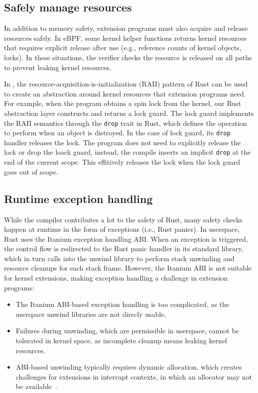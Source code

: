 \subsection{Safely manage resources}
In addition to memory safety, extension programs must also acquire and release
    resources safely.
In eBPF, some kernel helper functions returns kernel resources that requires
    explicit release after use (e.g., reference counts of kernel objects,
    locks).
In these situations, the verifier checks the resource is released on all paths
    to prevent leaking kernel resources.

In \projname{}, the resource-acquisition-is-initialization (RAII) pattern of
    Rust can be used to create an abstraction around kernel resources that
    extension programs need.
For example, when the program obtains a spin lock from the kernel, our Rust
    abstraction layer constructs and returns a lock guard.
The lock guard implements the RAII semantics through the \texttt{drop} trait in
    Rust, which defines the operation to perform when an object is distroyed.
In the case of lock guard, its \texttt{drop} handler releases the lock.
The program does not need to explicitly release the lock or drop the loack
    guard, instead, the compile inserts an implicit \texttt{drop} at the end of
    the current scope. This effitively releases the lock when the lock guard
    goes out of scope.

\subsection{Runtime exception handling}
While the compiler contributes a lot to the safety of Rust, many safety checks
    happen at runtime in the form of exceptions (i.e., Rust panics).
In userspace, Rust uses the Itanium exception handling ABI.
When an exception is triggered, the control flow is redirected to the Rust
    panic handler in its standard library, which in turn calls into the unwind
    library to perform stack unwinding and resource cleanups for each stack
    frame.
However, the Itanium ABI is not suitable for kernel extensions, making
    exception handling a challenge in extension programs:
\begin{itemize}
    \item The Itanium ABI-based exception handling is too complicated, as the
        userspace unwind libraries are not direcly usable.
    \item Failures during unwinding, which are permissible in userspace, cannot
        be tolerated in kernel space, as incomplete cleanup means leaking
        kernel resources.
    \item ABI-based unwinding typically requires dynamic allocation, which
        creates challenges for extensions in interrupt contexts, in which an
        allocator may not be available~\cite{bpf-mempool-lwn}.
\end{itemize}

